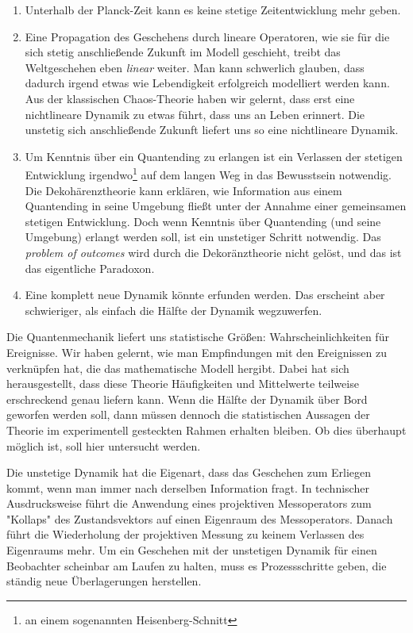 \documentclass[12pt]{article}
\begin{document}
\begin{enumerate}
    \item Unterhalb der Planck-Zeit kann es keine stetige Zeitentwicklung mehr geben.
    \item Eine Propagation des Geschehens durch lineare Operatoren, wie sie für die sich stetig anschließende Zukunft im Modell geschieht, treibt das Weltgeschehen eben \emph{linear} weiter. Man kann schwerlich glauben, dass dadurch irgend etwas wie Lebendigkeit erfolgreich modelliert werden kann. Aus der klassischen Chaos-Theorie haben wir gelernt, dass erst eine nichtlineare Dynamik zu etwas führt, dass uns an Leben erinnert. Die unstetig sich anschließende Zukunft liefert uns so eine nichtlineare Dynamik.
    \item Um Kenntnis über ein Quantending zu erlangen ist ein Verlassen der stetigen Entwicklung irgendwo\footnote{an einem sogenannten Heisenberg-Schnitt} auf dem langen Weg in das Bewusstsein notwendig. Die Dekohärenztheorie kann erklären, wie Information aus einem Quantending in seine Umgebung fließt unter der Annahme einer gemeinsamen stetigen Entwicklung. Doch wenn Kenntnis über Quantending (und seine Umgebung) erlangt werden soll, ist ein unstetiger Schritt notwendig. Das \emph{problem of outcomes} wird durch die Dekoränztheorie nicht gelöst, und das ist das eigentliche Paradoxon.
    \item Eine komplett neue Dynamik könnte erfunden werden. Das erscheint aber schwieriger, als einfach die Hälfte der Dynamik wegzuwerfen.
\end{enumerate}
Die Quantenmechanik liefert uns statistische Größen: Wahrscheinlichkeiten für Ereignisse. Wir haben gelernt, wie man Empfindungen mit den Ereignissen zu verknüpfen hat, die das mathematische Modell hergibt. Dabei hat sich herausgestellt, dass diese Theorie Häufigkeiten und Mittelwerte teilweise erschreckend genau liefern kann. Wenn die Hälfte der Dynamik über Bord geworfen werden soll, dann müssen dennoch die statistischen Aussagen der Theorie im experimentell gesteckten Rahmen erhalten bleiben. Ob dies überhaupt möglich ist, soll hier untersucht werden. 

Die unstetige Dynamik hat die Eigenart, dass das Geschehen zum Erliegen kommt, wenn man immer nach derselben Information fragt. In technischer Ausdrucksweise führt die Anwendung eines projektiven Messoperators zum "Kollaps" des Zustandsvektors auf einen Eigenraum des Messoperators. Danach führt die Wiederholung der projektiven Messung zu keinem Verlassen des Eigenraums mehr. Um ein Geschehen mit der unstetigen Dynamik für einen Beobachter scheinbar am Laufen zu halten, muss es Prozessschritte geben, die ständig neue Überlagerungen herstellen.
\end{document}
